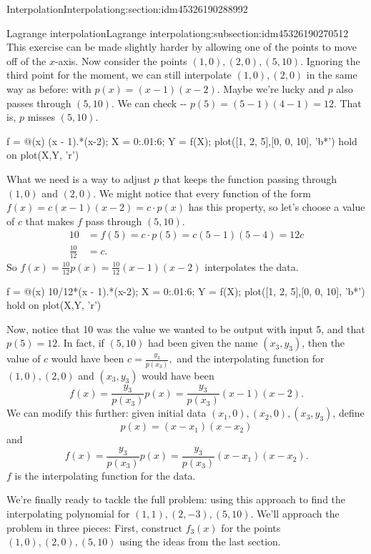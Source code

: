\documentclass[oneside,10pt,]{article}
\numberwithin{equation}{section}
\numberwithin{equation}{section}
\newcommand{\amp}{&}
\begin{document}
\begin{sectionptx}{Interpolation}{}{Interpolation}{}{}{g:section:idm45326190288992}
\begin{subsectionptx}{Lagrange interpolation}{}{Lagrange interpolation}{}{}{g:subsection:idm45326190270512}
This exercise can be made slightly harder by allowing one of the points to move off of the \(x\)-axis. Now consider the points \((1,0),(2,0), (5,10)\). Ignoring the third point for the moment, we can still interpolate \((1,0), (2,0)\) in the same way as before: with \(p(x) = (x -1)(x-2)\). Maybe we're lucky and \(p\) also passes through \((5,10)\). We can check -{}-{} \(p(5) = (5-1)(4-1) = 12\). That is, \(p\) misses \((5,10)\).%
\begin{sageinput}
f = @(x) (x - 1).*(x-2);
X = 0:.01:6;
Y = f(X);
plot([1, 2, 5],[0, 0, 10], 'b*')
hold on
plot(X,Y, 'r')
\end{sageinput}
What we need is a way to adjust \(p\) that keeps the function passing through \((1,0)\) and \((2,0)\). We might notice that every function of the form \(f(x) = c(x-1)(x-2) = c\cdot p(x)\) has this property, so let's choose a value of \(c\) that makes \(f\) pass through \((5,10)\).%
\begin{align*}
10 \amp= f(5) = c\cdot p(5) = c(5-1)(5-4) = 12c\\
\frac{10}{12} \amp= c.
\end{align*}
So \(f(x) = \frac{10}{12} p(x) = \frac{10}{12} (x-1)(x-2)\) interpolates the data.%
\begin{sageinput}
f = @(x) 10/12*(x - 1).*(x-2);
X = 0:.01:6;
Y = f(X);
plot([1, 2, 5],[0, 0, 10], 'b*')
hold on
plot(X,Y, 'r')
\end{sageinput}
Now, notice that 10 was the value we wanted to be output with input 5, and that \(p(5) = 12\). In fact, if \((5,10)\) had been given the name \((x_3, y_3)\), then the value of \(c\) would have been \(c = \frac{y_3}{p(x_3)},\) and the interpolating function for \((1,0), (2,0)\) and \((x_3, y_3)\) would have been%
\begin{equation*}
f(x) = \frac{y_3}{p(x_3)} p(x) = \frac{y_3}{p(x_3)} (x - 1)(x-2).
\end{equation*}
We can modify this further: given initial data \((x_1, 0), (x_2, 0), (x_3, y_3)\), define%
\begin{equation*}
p(x) = (x - x_1)(x - x_2)
\end{equation*}
and%
\begin{equation*}
f(x) = \frac{y_3}{p(x_3)} p(x) = \frac{y_3}{p(x_3)}(x - x_1)(x-x_2).
\end{equation*}
\(f\) is the interpolating function for the data.%
\par
We're finally ready to tackle the full problem: using this approach to find the interpolating polynomial for \((1,1), (2, -3), (5,10)\). We'll approach the problem in three pieces: First, construct \(f_3(x)\) for the points \((1,0), (2,0), (5,10)\) using the ideas from the last section.%

\end{subsectionptx}
\end{sectionptx}
\end{document}
